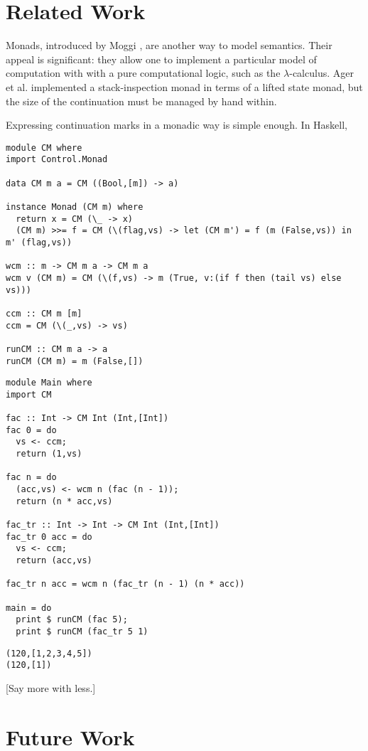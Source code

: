 \documentclass{llncs}
\newcommand{\lc}[0]{$\lambda$-calculus}
\begin{document}
\section{Related Work}

Monads, introduced by Moggi \cite{moggi1989computational}, are another way to model semantics. Their appeal is significant: they allow one to implement a particular model of computation with with a pure computational logic, such as the \lc. Ager et al. \cite{ager2003functional} implemented a stack-inspection monad in terms of a lifted state monad, but the size of the continuation must be managed by hand within.

Expressing continuation marks in a monadic way is simple enough. In Haskell,
\begin{verbatim}
module CM where
import Control.Monad

data CM m a = CM ((Bool,[m]) -> a)

instance Monad (CM m) where
  return x = CM (\_ -> x)
  (CM m) >>= f = CM (\(flag,vs) -> let (CM m') = f (m (False,vs)) in m' (flag,vs))

wcm :: m -> CM m a -> CM m a
wcm v (CM m) = CM (\(f,vs) -> m (True, v:(if f then (tail vs) else vs)))

ccm :: CM m [m]
ccm = CM (\(_,vs) -> vs)

runCM :: CM m a -> a
runCM (CM m) = m (False,[])
\end{verbatim}

\begin{verbatim}
module Main where
import CM

fac :: Int -> CM Int (Int,[Int])
fac 0 = do
  vs <- ccm;
  return (1,vs)

fac n = do
  (acc,vs) <- wcm n (fac (n - 1));
  return (n * acc,vs)

fac_tr :: Int -> Int -> CM Int (Int,[Int])
fac_tr 0 acc = do
  vs <- ccm;
  return (acc,vs)

fac_tr n acc = wcm n (fac_tr (n - 1) (n * acc))

main = do
  print $ runCM (fac 5);
  print $ runCM (fac_tr 5 1)
\end{verbatim}

\begin{verbatim}
(120,[1,2,3,4,5])
(120,[1])
\end{verbatim}
[Say more with less.]


\section{Future Work}
\end{document}
